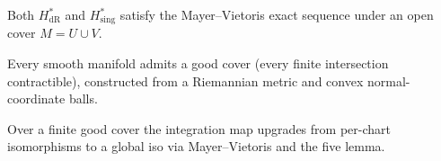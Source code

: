\begin{lemma}
\label{lem:deRham-mayer-vietoris}
Both $H^{*}_{\mathrm{dR}}$ and $H^{*}_{\mathrm{sing}}$ satisfy the Mayer--Vietoris exact sequence under an open cover $M = U \cup V$.
\leanok
\end{lemma}

\begin{lemma}
\label{lem:deRham-good-cover-exists}
Every smooth manifold admits a good cover (every finite intersection contractible), constructed from a Riemannian metric and convex normal-coordinate balls.
\leanok
\end{lemma}

\begin{lemma}
\label{lem:deRham-five-lemma-induction}
Over a finite good cover the integration map upgrades from per-chart isomorphisms to a global iso via Mayer--Vietoris and the five lemma.
\leanok
\end{lemma}

